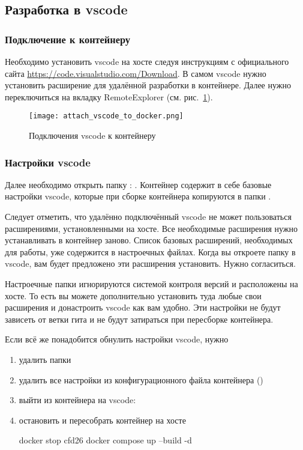 \subsection{Разработка в vscode}
\subsubsection{Подключение к контейнеру}
Необходимо установить vscode на хосте следуя инструкциям с официального сайта \url{https://code.visualstudio.com/Download}.
В самом vscode нужно установить расширение  для удалённой разработки в контейнере. 
Далее нужно переключиться на вкладку RemoteExplorer (см. рис.~\ref{fig:vscode_to_docker}).

\begin{figure}[h]
\centering
\texttt{[image: attach\_vscode\_to\_docker.png]}
\caption{Подключения vscode к контейнеру}
\label{fig:vscode_to_docker}
\end{figure}

\subsubsection{Настройки vscode}
Далее необходимо открыть папку \ename{\app}: .
Контейнер содержит в себе базовые настройки vscode, которые при сборке контейнера
копируются в папки .

Следует отметить, что удалённо подключённый vscode не может пользоваться
расширениями, установленными на хосте. Все необходимые расширения нужно устанавливать в контейнер заново.
Список базовых расширений, необходимых для работы, уже содержится в настроечных файлах.
Когда вы откроете папку  в vscode, вам будет предложено эти расширения установить. Нужно согласиться.

Настроечные папки  игнорируются системой контроля версий и расположены на хосте.
То есть вы можете дополнительно установить туда любые свои расширения и донастроить vscode как вам удобно.
Эти настройки не будут зависеть от ветки гита и не будут затираться при пересборке контейнера.

Если всё же понадобится обнулить настройки vscode, нужно
\begin{enumerate}
\item удалить папки 
\item удалить все настройки из конфигурационного файла контейнера ()
\item выйти из контейнера на vscode: 
\item остановить и пересобрать контейнер на хосте
\begin{shelloutput}
docker stop cfd26
docker compose up --build -d
\end{shelloutput}
\end{enumerate}

